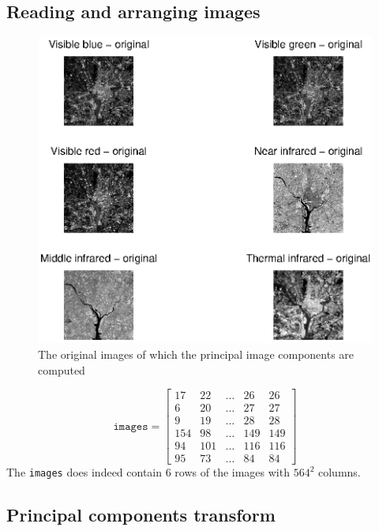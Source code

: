 \subsection{Reading and arranging images}
\begin{figure}[htb]
 \centering
 \includegraphics[width=\linewidth]{original_pca.eps}
 \caption{The original images of which the principal image components are computed}
 \label{fig:original_pca}
\end{figure}
\[
\texttt{images} = \begin{bmatrix}
	17  & 22  & \ldots & 26  & 26   \\[0.3em]
	6   & 20  & \ldots & 27  & 27   \\[0.3em]
	9   & 19  & \ldots & 28  & 28   \\[0.3em]
	154 & 98  & \ldots & 149 & 149  \\[0.3em]     
	94  & 101 & \ldots & 116 & 116  \\[0.3em]
	95  & 73  & \ldots & 84  & 84  
\end{bmatrix}
\]
The \texttt{images} does indeed contain 6 rows of the images with \(564^2\) columns.
\clearpage

\subsection{Principal components transform}

